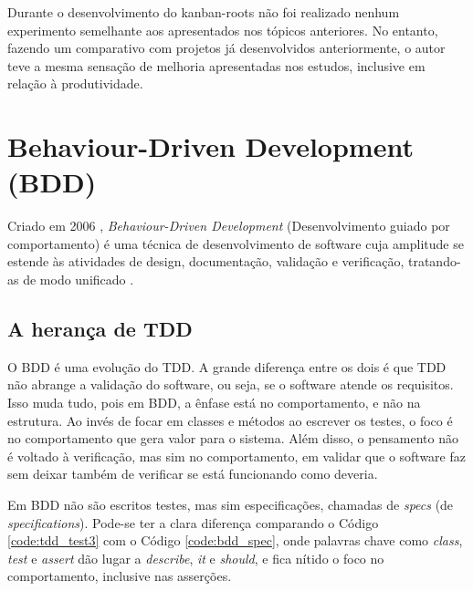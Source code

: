 Durante o desenvolvimento do kanban-roots não foi realizado nenhum experimento semelhante aos apresentados nos tópicos anteriores. No entanto, fazendo um comparativo com projetos já desenvolvidos anteriormente, o autor teve a mesma sensação de melhoria apresentadas nos estudos, inclusive em relação à produtividade.





\section{Behaviour-Driven Development (BDD)}
\label{sec:bdd}

Criado em 2006 \cite{IntroducingBDD}, \textit{Behaviour-Driven Development} (Desenvolvimento guiado por comportamento) é uma técnica de desenvolvimento de software cuja amplitude se estende às atividades de design, documentação, validação e verificação, tratando-as de modo unificado \cite{BDDRodrigo}.

\subsection{A herança de TDD}
\label{sub:a_heranca_de_tdd}

O BDD é uma evolução do TDD. A grande diferença entre os dois é que TDD não abrange a validação do software, ou seja, se o software atende os requisitos. Isso muda tudo, pois em BDD, a ênfase está no comportamento, e não na estrutura. Ao invés de focar em classes e métodos ao escrever os testes, o foco é no comportamento que gera valor para o sistema. Além disso, o pensamento não é voltado à verificação, mas sim no comportamento, em validar que o software faz sem deixar também de verificar se está funcionando como deveria.

Em BDD não são escritos testes, mas sim especificações, chamadas de \textit{specs} (de \textit{specifications}). Pode-se ter a clara diferença comparando o Código \ref{code:tdd_test3} com o Código \ref{code:bdd_spec}, onde palavras chave como \textit{class}, \textit{test} e \textit{assert} dão lugar a \textit{describe}, \textit{it} e \textit{should}, e fica nítido o foco no comportamento, inclusive nas asserções.

